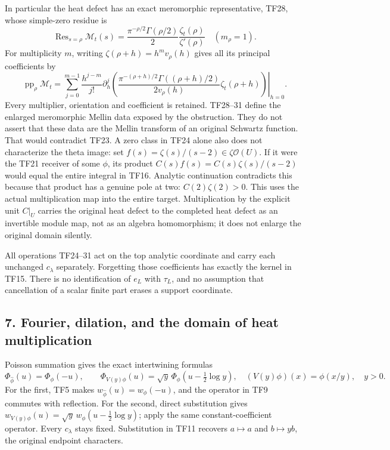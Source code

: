 \documentclass[
  10pt,
  a4paper,
]{article}
\begin{document}
In particular the heat defect has an exact meromorphic representative,
TF28, whose simple-zero residue is \[
\operatorname{Res}_{s=\rho}\mathcal M_t(s)
=\frac{\pi^{-\rho/2}\Gamma(\rho/2)}2
\frac{\zeta_t(\rho)}{\zeta'(\rho)}\quad(m_\rho=1).
\tag{TF30}
\] For multiplicity \(m\), writing \(\zeta(\rho+h)=h^m v_\rho(h)\) gives
all its principal coefficients by \[
\operatorname{pp}_\rho\mathcal M_t
=\sum_{j=0}^{m-1}\frac{h^{j-m}}{j!}
\left.\partial_h^j
\left(\frac{\pi^{-(\rho+h)/2}\Gamma((\rho+h)/2)}{2v_\rho(h)}
\zeta_t(\rho+h)\right)\right|_{h=0}.
\tag{TF31}
\] Every multiplier, orientation and coefficient is retained. TF28--31
define the enlarged meromorphic Mellin data exposed by the obstruction.
They do not assert that these data are the Mellin transform of an
original Schwartz function. That would contradict TF23. A zero class in
TF24 alone also does not characterize the theta image: set
\(f(s)=\zeta(s)/(s-2)\in\zeta\mathcal O(U)\). If it were the TF21
receiver of some \(\phi\), its product \(C(s)f(s)=C(s)\zeta(s)/(s-2)\)
would equal the entire integral in TF16. Analytic continuation
contradicts this because that product has a genuine pole at two:
\(C(2)\zeta(2)>0\). This uses the actual multiplication map into the
entire target. Multiplication by the explicit unit \(C|_U\) carries the
original heat defect to the completed heat defect as an invertible
module map, not as an algebra homomorphism; it does not enlarge the
original domain silently.

All operations TF24--31 act on the top analytic coordinate and carry
each unchanged \(c_\lambda\) separately. Forgetting those coefficients
has exactly the kernel in TF15. There is no identification of \(e_L\)
with \(\tau_L\), and no assumption that cancellation of a scalar finite
part erases a support coordinate.

\subsection{7. Fourier, dilation, and the domain of heat
multiplication}\label{fourier-dilation-and-the-domain-of-heat-multiplication}

Poisson summation gives the exact intertwining formulas \[
\Phi_{\widehat\phi}(u)=\Phi_\phi(-u),\qquad
\Phi_{V(y)\phi}(u)=\sqrt y\,\Phi_\phi(u-\tfrac12\log y),
\quad (V(y)\phi)(x)=\phi(x/y),\quad y>0.
\tag{TF32}
\] For the first, TF5 makes \(w_{\widehat\phi}(u)=w_\phi(-u)\), and the
operator in TF9 commutes with reflection. For the second, direct
substitution gives
\(w_{V(y)\phi}(u)=\sqrt y\,w_\phi(u-\tfrac12\log y)\); apply the same
constant-coefficient operator. Every \(c_\lambda\) stays fixed.
Substitution in TF11 recovers \(a\mapsto a\) and \(b\mapsto yb\), the
original endpoint characters.
\end{document}
